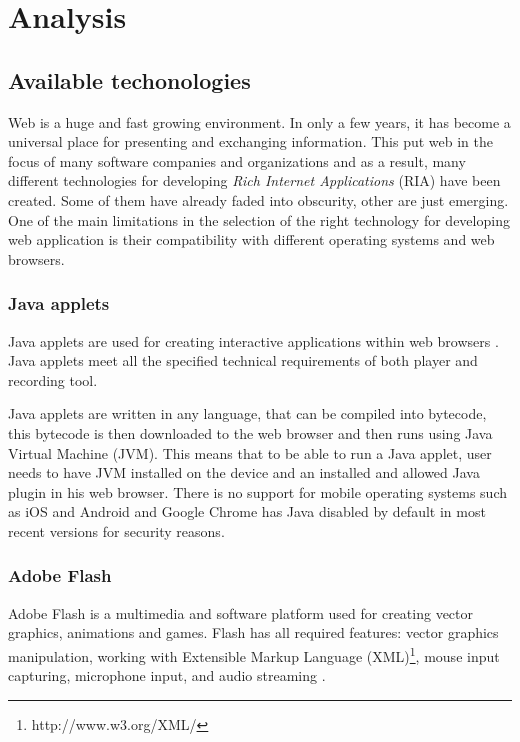 \chapter{Analysis}













\section{Available techonologies}

Web is a huge and fast growing environment. In only a few years, it has become a universal place for presenting and exchanging information. This put web in the focus of many software companies and organizations and as a result, many different technologies for developing \textit{Rich Internet Applications} (RIA) have been created. Some of them have already faded into obscurity, other are just emerging. One of the main limitations in the selection of the right technology for developing web application is their compatibility with different operating systems and web browsers.

\subsection{Java applets}
Java applets are used for creating interactive applications within web browsers \cite{java}. Java applets meet all the specified technical requirements of both player and recording tool.

Java applets are written in any language, that can be compiled into bytecode, this bytecode is then downloaded to the web browser and then runs using Java Virtual Machine (JVM). This means that to be able to run a Java applet, user needs to have JVM installed on the device and an installed and allowed Java plugin in his web browser. There is no support for mobile operating systems such as iOS and Android \cite{java_mobile} and Google Chrome has Java disabled by default in most recent versions  for security reasons.

\subsection{Adobe Flash}
Adobe Flash is a multimedia and software platform used for creating vector graphics, animations and games. Flash has all required features: vector graphics manipulation, working with Extensible Markup Language (XML)\footnote{http://www.w3.org/XML/}, mouse input capturing, microphone input, and audio streaming \cite{flash}. 

